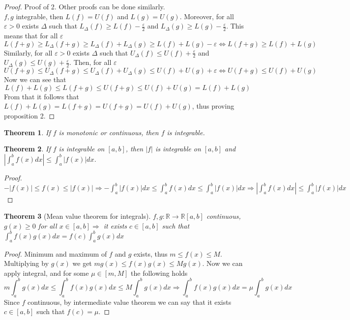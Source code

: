 \documentclass{article}
\newcommand{\abs}[1]{\left|#1\right|}
\newcommand{\Ar}{\Rightarrow}
\newcommand{\fOnR}[1]{#1 : \mathbb{R} \rightarrow \mathbb{R}}
\newcommand{\intcc}[1]{\left[#1\right]}
\theoremstyle{definition}
\theoremstyle{definition}
\theoremstyle{plain}
\newtheorem{theorem}{Theorem}[section]
\theoremstyle{plain}
\theoremstyle{plain}
\theoremstyle{plain}
\theoremstyle{definition}
\theoremstyle{remark}
\theoremstyle{remark}
\theoremstyle{remark}
\theoremstyle{remark}
\newcommand{\E}{\varepsilon}
\begin{document}
\begin{proof}
  Proof of 2. Other proofs can be done similarly.
\\$f,g$ integrable, then $L(f) = U(f)$ and $L(g) = U(g)$. Moreover, for all $\E > 0$ exists $\Delta$ such that $L_\Delta(f) \geq L(f) - \frac{\E}2$ and $L_\Delta(g) \geq L(g) - \frac{\E}2$. This means that for all $\E$
  \[
  L(f+g) \geq L_\Delta(f+g) \geq L_\Delta(f) + L_\Delta(g) \geq L(f) + L(g) - \E \iff L(f+g) \geq L(f) + L(g)
  \]
  Similarly, for all $\E > 0$ exists $\Delta$ such that $U_\Delta(f) \leq U(f) + \frac{\E}2$ and $U_\Delta(g) \leq U(g) + \frac{\E}2$. Then, for all $\E$
  \[
  U(f+g) \leq U_\Delta(f+g) \leq U_\Delta(f) + U_\Delta(g) \leq U(f) + U(g) + \E \iff U(f+g) \leq U(f) + U(g)
  \]
  Now we can see that
  \[
  L(f) + L(g) \leq L(f+g) \leq U(f+g) \leq U(f) + U(g) = L(f) + L(g)
  \]
  From that it follows that $L(f) + L(g) = L(f+g) = U(f+g) = U(f) + U(g)$, thus proving proposition 2.
\end{proof}


\begin{theorem}
  If $f$ is monotonic or continuous, then $f$ is integrable.
\end{theorem}


\begin{theorem}
  If $f$ is integrable on $\intcc{a,b}$, then $|f|$ is integrable on $\intcc{a,b}$ and $\abs{\int_a^b f(x) dx} \leq \int_a^b |f(x)| dx$.
\end{theorem}

\begin{proof}
  $-|f(x)| \leq f(x) \leq |f(x)| \Ar -\int_a^b |f(x)| dx \leq \int_a^b f(x) dx \leq \int_a^b |f(x)| dx \Ar \abs{\int_a^b f(x) dx} \leq \int_a^b |f(x)| dx$
\end{proof}


\begin{theorem}[Mean value theorem for integrals]
  $\fOnR{f,g}{\intcc{a,b}}$ continuous, $g(x) \geq 0$ for all $x \in \intcc{a,b} \Ar$ it exists $c \in \intcc{a,b}$ such that $\int_a^b f(x)g(x) dx = f(c) \int_a^b g(x) dx$
\end{theorem}

\begin{proof}
  Minimum and maximum of $f$ and $g$ exists, thus $m \leq f(x) \leq M$. Multiplying by $g(x)$ we get $mg(x) \leq f(x)g(x) \leq Mg(x)$. Now we can apply integral, and for some $\mu \in \intcc{m,M}$ the following holds
  \[
  m \int_a^b g(x) dx \leq \int_a^b f(x)g(x) dx \leq M \int_a^b g(x) dx \Ar \int_a^b f(x)g(x) dx =
  \mu \int_a^b g(x) dx
  \]
  Since $f$ continuous, by intermediate value theorem we can say that it exists $c \in \intcc{a,b}$ such that $f(c) = \mu$.
\end{proof}
\end{document}
